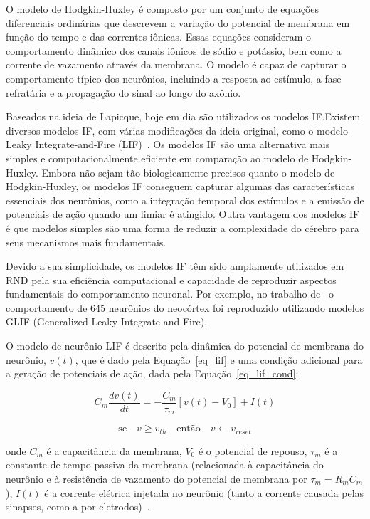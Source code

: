 O modelo de Hodgkin-Huxley é composto por um conjunto de equações diferenciais ordinárias que descrevem a variação do potencial de
membrana em função do tempo e das correntes iônicas. Essas equações consideram o comportamento dinâmico dos canais iônicos de
sódio e potássio, bem como a corrente de vazamento através da membrana. O modelo é capaz de capturar o comportamento típico dos
neurônios, incluindo a resposta ao estímulo, a fase refratária e a propagação do sinal ao longo do axônio.

Baseados na ideia de Lapicque, hoje em dia são utilizados os modelos IF.\@ Existem diversos modelos IF, com
várias modificações da ideia original, como o modelo Leaky Integrate-and-Fire (LIF)~\cite{burkittReview2006}. Os modelos IF são
uma alternativa mais simples e computacionalmente eficiente em comparação ao modelo de Hodgkin-Huxley. Embora não sejam tão
biologicamente precisos quanto o modelo de Hodgkin-Huxley, os modelos IF conseguem capturar algumas das características essenciais
dos neurônios, como a integração temporal dos estímulos e a emissão de potenciais de ação quando um limiar é atingido. Outra
vantagem dos modelos IF é que modelos simples são uma forma de reduzir a complexidade do cérebro para seus mecanismos mais
fundamentais.

Devido a sua simplicidade, os modelos IF têm sido amplamente utilizados em RND pela sua eficiência computacional e capacidade de
reproduzir aspectos fundamentais do comportamento neuronal. Por exemplo, no trabalho de~ o
comportamento de 645 neurônios do neocórtex foi reproduzido utilizando modelos GLIF (Generalized Leaky Integrate-and-Fire). 

O modelo de neurônio LIF é descrito pela dinâmica do potencial de membrana do neurônio, $v(t)$, que é dado pela
Equação~\ref{eq_lif} e uma condição adicional para a geração de potenciais de ação, dada pela Equação~\ref{eq_lif_cond}:

\begin{equation}
\label{eq_lif}
C_m \frac{dv(t)}{dt} = -\frac{C_m}{\tau_m} [v(t) - V_0] + I(t)
\end{equation}

\begin{equation}
\label{eq_lif_cond}
\text{se}\quad v \ge v_{th} \quad \text{então} \quad v \gets v_{reset}
\end{equation}

\noindent{}onde $C_m$ é a capacitância da membrana, $V_0$ é o potencial de repouso, $\tau_m$ é a constante de tempo passiva da membrana
(relacionada à capacitância do neurônio e à resistência de vazamento do potencial de membrana por $\tau_m = R_m C_m$), $I(t)$ é a
corrente elétrica injetada no neurônio (tanto a corrente causada pelas sinapses, como a por eletrodos)~\cite{burkittReview2006}. 

